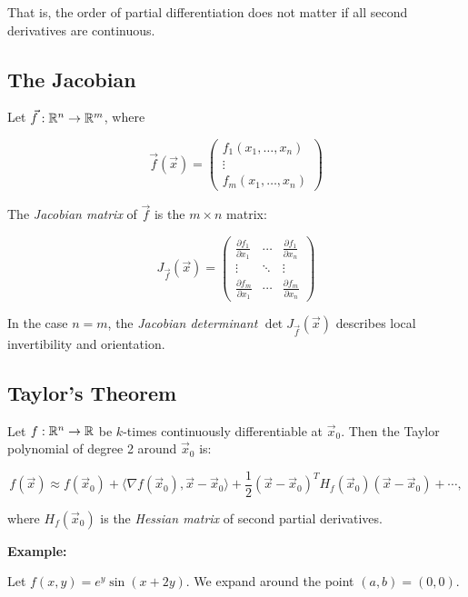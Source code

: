 That is, the order of partial differentiation does not matter if all second derivatives are continuous.

\subsection{The Jacobian}

Let \( \vec{f} : \mathbb{R}^n \to \mathbb{R}^m \), where

\[
    \vec{f}(\vec{x}) = \begin{pmatrix}
    f_1(x_1, \dots, x_n) \\
    \vdots \\
    f_m(x_1, \dots, x_n)
    \end{pmatrix}
\]

The \emph{Jacobian matrix} of \( \vec{f} \) is the \( m \times n \) matrix:

\[
    J_{\vec{f}}(\vec{x}) = \begin{pmatrix}
    \frac{\partial f_1}{\partial x_1} & \cdots & \frac{\partial f_1}{\partial x_n} \\
    \vdots & \ddots & \vdots \\
    \frac{\partial f_m}{\partial x_1} & \cdots & \frac{\partial f_m}{\partial x_n}
    \end{pmatrix}
\]

In the case \( n = m \), the \emph{Jacobian determinant} \( \det J_{\vec{f}}(\vec{x}) \) 
describes local invertibility and orientation.


\subsection{Taylor's Theorem}

Let \( f : \mathbb{R}^n \to \mathbb{R} \) be \( k \)-times continuously differentiable at \( \vec{x}_0 \). Then the Taylor polynomial of degree 2 around \( \vec{x}_0 \) is:

\[
f(\vec{x}) \approx f(\vec{x}_0) + \langle \nabla f(\vec{x}_0), \vec{x} - \vec{x}_0 \rangle + \frac{1}{2} {(\vec{x} - \vec{x}_0)}^T H_f(\vec{x}_0)(\vec{x} - \vec{x}_0) + \cdots,
\]

where \( H_f(\vec{x}_0) \) is the \emph{Hessian matrix} of second partial derivatives.
\vspace{\baselineskip}

\textbf{Example:} 
\vspace{\baselineskip}

Let \( f(x, y) = e^y \sin(x + 2y) \). We expand around the point \( (a, b) = (0, 0) \).
\vspace{\baselineskip}

